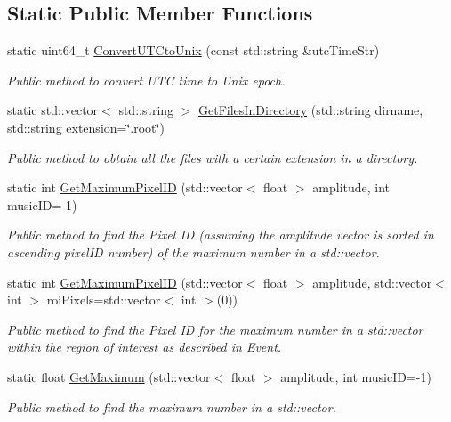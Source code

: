 \subsection*{Static Public Member Functions}
\begin{DoxyCompactItemize}
\item 
static uint64\+\_\+t \hyperlink{classIUtilities_af2a541760de5896aa5d89a684c2cd8d6}{Convert\+U\+T\+Cto\+Unix} (const std\+::string \&utc\+Time\+Str)
\begin{DoxyCompactList}\small\item\em Public method to convert U\+TC time to Unix epoch. \end{DoxyCompactList}\item 
static std\+::vector$<$ std\+::string $>$ \hyperlink{classIUtilities_affbe6e61c3f1c6169044273a7e1f83ba}{Get\+Files\+In\+Directory} (std\+::string dirname, std\+::string extension=\char`\"{}.root\char`\"{})
\begin{DoxyCompactList}\small\item\em Public method to obtain all the files with a certain extension in a directory. \end{DoxyCompactList}\item 
static int \hyperlink{classIUtilities_a6a2664bbaa82bed0028c676a2b1b411a}{Get\+Maximum\+Pixel\+ID} (std\+::vector$<$ float $>$ amplitude, int music\+ID=-\/1)
\begin{DoxyCompactList}\small\item\em Public method to find the Pixel ID (assuming the amplitude vector is sorted in ascending pixel\+ID number) of the maximum number in a std\+::vector. \end{DoxyCompactList}\item 
static int \hyperlink{classIUtilities_aa5cc1c99b228caf689176928478995cd}{Get\+Maximum\+Pixel\+ID} (std\+::vector$<$ float $>$ amplitude, std\+::vector$<$ int $>$ roi\+Pixels=std\+::vector$<$ int $>$(0))
\begin{DoxyCompactList}\small\item\em Public method to find the Pixel ID for the maximum number in a std\+::vector within the region of interest as described in \hyperlink{classEvent}{Event}. \end{DoxyCompactList}\item 
static float \hyperlink{classIUtilities_a13f7d8d17e744480f85c2b2e789e544e}{Get\+Maximum} (std\+::vector$<$ float $>$ amplitude, int music\+ID=-\/1)
\begin{DoxyCompactList}\small\item\em Public method to find the maximum number in a std\+::vector. \end{DoxyCompactList}\item 

\end{DoxyCompactItemize}
